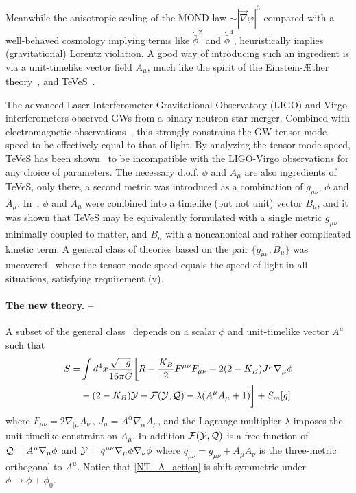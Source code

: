 \documentclass[twocolumn,prl,preprintnumbers,amsmath,amssymb,nofootinbib]{revtex4-2}
\newcommand{\grad}{\ensuremath{\vec{\nabla}}}
\newcommand{\phib}{{\bar{\phi}}}
\newcommand{\Fh}{F}
\newcommand{\Ah}{{A}}
\newcommand{\Jh}{{J}}
\newcommand{\Fcal}{{\cal F}}
\newcommand{\Qcal}{{\cal Q}}
\newcommand{\Ycal}{{\cal Y}}
\newcommand{\metM}{\ensuremath{g}}
\newcommand{\Gt}{\ensuremath{\tilde{G}}}
\newcommand{\KB}{\ensuremath{K_{B}}}
\begin{document}
Meanwhile the anisotropic scaling of the MOND law $\sim |\grad\varphi|^3$ compared with 
a well-behaved cosmology implying terms like $\dot{\phib}^2$ and $\dot{\phib}^4$, heuristically implies (gravitational) Lorentz violation.
A good way of introducing such an ingredient is via a unit-timelike vector field $A_\mu$,  much like the spirit of the Einstein-{\AE}ther theory~\cite{Dirac1962,JacobsonMattingly2000},
and TeVeS~\cite{Sanders1997,Bekenstein2004}.

The advanced Laser Interferometer Gravitational Observatory (LIGO) and
Virgo interferometers \cite{TheLIGOScientific:2017qsa} observed GWs from a binary neutron star merger.
Combined with electromagnetic observations~\cite{Goldstein:2017mmi,Savchenko:2017ffs}, this strongly constrains the GW tensor mode speed to be effectively equal to that of light. 
By analyzing the tensor mode speed, TeVeS has been shown~\cite{BoranEtAl2017,GongEtAl2018,HouGong2018,SkordisZlosnik2019}  
 to be incompatible with the LIGO-Virgo observations for any choice of parameters. 
The necessary d.o.f. $\phi$ and $A_\mu$ are also ingredients of TeVeS,
only there, a second metric was introduced as a combination of $g_{\mu\nu}$, $\phi$ and $A_\mu$. In~\cite{ZlosnikFerreiraStarkman2006b},
$\phi$ and $A_\mu$ were combined into a timelike (but not unit) vector $B_\mu$, and it was shown that
 TeVeS may be equivalently formulated with a single metric  $g_{\mu\nu}$  minimally coupled to matter, 
and  $B_{\mu}$ with a noncanonical and rather complicated kinetic term.
A general class of theories based on the pair $\{g_{\mu\nu},B_\mu\}$ was uncovered~\cite{SkordisZlosnik2019} where the tensor mode speed equals the speed of light in all situations, satisfying requirement (v).

\paragraph{The new theory. --}
A subset of the general class~\cite{SkordisZlosnik2019}  depends on a scalar $\phi$ and
unit-timelike vector $A^\mu$ such that~\cite{SkordisZlosnikInPreparation}
\begin{align}
S =&  \int d^4x \frac{\sqrt{-\metM}}{16\pi \Gt} \bigg[ R  
 - \frac{\KB}{2}  \Fh^{\mu\nu} \Fh_{\mu\nu} 
+ 2  (2-\KB) \Jh^\mu\nabla_\mu \phi
\nonumber
\\
&
- (2-\KB) \Ycal
- \Fcal(\Ycal,\Qcal)
 - \lambda(\Ah^\mu \Ah_\mu+1)\bigg] + S_m[g]
\label{NT_A_action}
\end{align}
where $\Fh_{\mu\nu} =2\nabla_{[\mu} \Ah_{\nu]}$, $\Jh_\mu = \Ah^\alpha \nabla_\alpha \Ah_\mu$,
and the Lagrange multiplier $\lambda$ imposes the unit-timelike constraint on $\Ah_\mu$. In addition $\Fcal(\Ycal,\Qcal)$ is a free function of 
$\Qcal = \Ah^\mu \nabla_\mu \phi$ and $\Ycal= q^{\mu\nu} \nabla_\mu \phi \nabla_\nu \phi$ where 
$q_{\mu\nu} = g_{\mu\nu} + \Ah_\mu \Ah_\nu$ is the three-metric orthogonal to $\Ah^\mu$.
Notice that \eqref{NT_A_action} is shift symmetric under $\phi \rightarrow \phi + \phi_0$.
\end{document}
